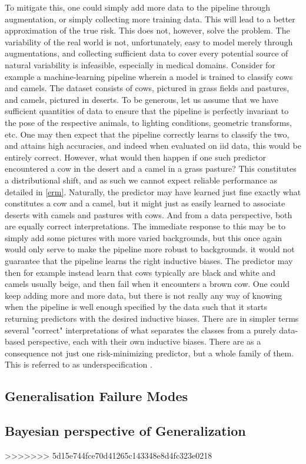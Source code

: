 To mitigate this, one could simply add more data to the pipeline through augmentation, or simply collecting more training data. This will lead to a better approximation of the true risk. This does not, however, solve the problem. The variability of the real world is not, unfortunately, easy to model merely through augmentations, and collecting sufficient data to cover every potential source of natural variability is infeasible, especially in medical domains.
Consider for example a machine-learning pipeline wherein a model is trained to classify cows and camels. The dataset consists of cows, pictured in grass fields and pastures, and camels, pictured in deserts. To be generous, let us assume that we have sufficient quantities of data to ensure that the pipeline is perfectly invariant to the pose of the respective animals, to lighting conditions, geometric transforms, etc. One may then expect that the pipeline correctly learns to classify the two, and attains high accuracies, and indeed when evaluated on iid data, this would be entirely correct. However, what would then happen if one such predictor encountered a cow in the desert and a camel in a grass pasture? This constitutes a distributional shift, and as such we cannot expect reliable performance as detailed in \ref{erm}. Naturally, the predictor may have learned just fine exactly what constitutes a cow and a camel, but it might just as easily learned to associate deserts with camels and pastures with cows. And from a data perspective, both are equally correct interpretations. The immediate response to this may be to simply add some pictures with more varied backgrounds, but this once again would only serve to make the pipeline more robust to backgrounds. it would not guarantee that the pipeline learns the right inductive biases. The predictor may then for example instead learn that cows typically are black and white and camels usually beige, and then fail when it encounters a brown cow. One could keep adding more and more data, but there is not really any way of knowing when the pipeline is well enough specified by the data such that it starts returning predictors with the desired inductive biases. There are in simpler terms several "correct" interpretations of what separates the classes from a purely data-based perspective, each with their own inductive biases. There are as a consequence not just one risk-minimizing predictor, but a whole family of them. This is referred to as underspecification \cite{damour2020underspecification}.

\subsection{Generalisation Failure Modes}

\subsection{Bayesian perspective of Generalization}
>>>>>>> 5d15e744fce70d41265c143348e8d4fc323e0218
